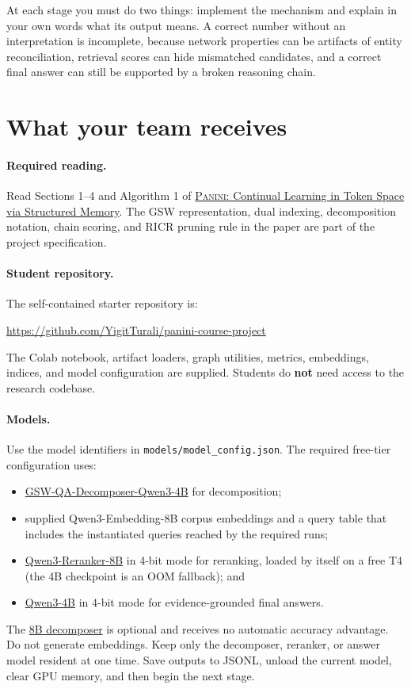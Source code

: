 \documentclass[11pt]{article}
\newcommand{\code}[1]{\texttt{#1}}
\newcommand{\RICR}{{\mdseries\textsc{RICR}}\xspace}
\newcommand{\PANINI}{{\mdseries\textsc{Panini}}\xspace}
\begin{document}
At each stage you must do two things: implement the mechanism and explain in
your own words what its output means. A correct number without an
interpretation is incomplete, because network properties can be artifacts of
entity reconciliation, retrieval scores can hide mismatched candidates, and a
correct final answer can still be supported by a broken reasoning chain.

\section{What your team receives}

\paragraph{Required reading.}
Read Sections 1--4 and Algorithm 1 of
\href{https://arxiv.org/abs/2602.15156}{\PANINI: Continual Learning in Token
Space via Structured Memory}. The GSW representation, dual indexing,
decomposition notation, chain scoring, and \RICR pruning rule in the paper are
part of the project specification.

\paragraph{Student repository.}
The self-contained starter repository is:
\begin{center}
\url{https://github.com/YigitTurali/panini-course-project}
\end{center}
The Colab notebook, artifact loaders, graph utilities, metrics, embeddings,
indices, and model configuration are supplied. Students do \textbf{not} need
access to the research codebase.

\paragraph{Models.}
Use the model identifiers in \code{models/model\_config.json}. The required
free-tier configuration uses:
\begin{itemize}
  \item \href{https://huggingface.co/yigitturali/GSW-QA-Decomposer-Qwen3-4B}
        {GSW-QA-Decomposer-Qwen3-4B} for decomposition;
  \item supplied Qwen3-Embedding-8B corpus embeddings and a query table that
        includes the instantiated queries reached by the required runs;
  \item \href{https://huggingface.co/Qwen/Qwen3-Reranker-8B}
        {Qwen3-Reranker-8B} in 4-bit mode for reranking, loaded by itself on a
        free T4 (the 4B checkpoint is an OOM fallback); and
  \item \href{https://huggingface.co/Qwen/Qwen3-4B}
        {Qwen3-4B} in 4-bit mode for evidence-grounded final answers.
\end{itemize}
The
\href{https://huggingface.co/yigitturali/GSW-QA-Decomposer-Qwen3-8B}
{8B decomposer} is optional and receives no automatic accuracy advantage.
Do not generate embeddings. Keep only the decomposer, reranker, or answer
model resident at one time. Save outputs to JSONL, unload the current model,
clear GPU memory, and then begin the next stage.
\end{document}
